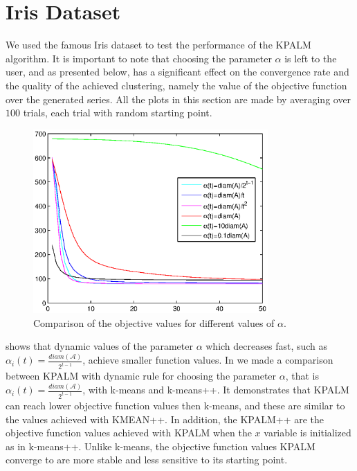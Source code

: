 \section{Iris Dataset}
We used the famous Iris dataset to test the performance of the KPALM algorithm. It is important to note that choosing the parameter $\alpha$ is left to the user, and as presented below, has a significant effect on the convergence rate and the quality of the achieved clustering, namely the value of the objective function over the generated series. All the plots in this section are made by averaging over $100$ trials, each trial with random starting point.

\begin{figure}[h]
    \centering
    \includegraphics[width=0.8\textwidth]{dynamic_alpha_kpalm}
    \caption{Comparison of the objective values for different values of $\alpha$.}
    \label{fig:dynamic_alpha_psi_comp}
\end{figure} 

 shows that dynamic values of the parameter $\alpha$ which decreases fast, such as $\alpha_i(t)=
\frac{diam(\mathcal{A})}{2^{t-1}}$, achieve smaller function values.
In  we made a comparison between KPALM with dynamic rule for choosing the parameter $\alpha$, that is $\alpha_i(t)=\frac{diam(\mathcal{A})}{2^{t-1}}$, with k-means and k-means++. It demonstrates that KPALM can reach lower objective function values then k-means, and these are similar to the values achieved with KMEAN++. In addition, the KPALM++ are the objective function values achieved with KPALM when the $x$ variable is initialized as in k-means++. Unlike k-means, the objective function values KPALM converge to are more stable and less sensitive to its starting point.

